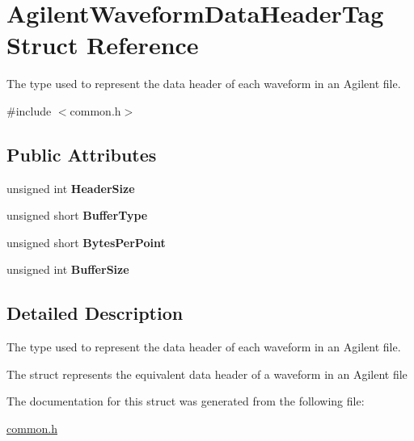 \hypertarget{structAgilentWaveformDataHeaderTag}{
\section{AgilentWaveformDataHeaderTag Struct Reference}
\label{structAgilentWaveformDataHeaderTag}
}


The type used to represent the data header of each waveform in an Agilent file.  




{\ttfamily \#include $<$common.h$>$}

\subsection*{Public Attributes}
\begin{DoxyCompactItemize}
\item 
\hypertarget{structAgilentWaveformDataHeaderTag_a4481ec545f9c73102462cf9e0370fc5c}{
unsigned int {\bfseries HeaderSize}}
\label{structAgilentWaveformDataHeaderTag_a4481ec545f9c73102462cf9e0370fc5c}

\item 
\hypertarget{structAgilentWaveformDataHeaderTag_a8a15a394ae79b88d0519b6ebff987bcc}{
unsigned short {\bfseries BufferType}}
\label{structAgilentWaveformDataHeaderTag_a8a15a394ae79b88d0519b6ebff987bcc}

\item 
\hypertarget{structAgilentWaveformDataHeaderTag_ae66073a59d0064c03ee35b16a212b4af}{
unsigned short {\bfseries BytesPerPoint}}
\label{structAgilentWaveformDataHeaderTag_ae66073a59d0064c03ee35b16a212b4af}

\item 
\hypertarget{structAgilentWaveformDataHeaderTag_ac3ccd48102c805f624124e14a86eb257}{
unsigned int {\bfseries BufferSize}}
\label{structAgilentWaveformDataHeaderTag_ac3ccd48102c805f624124e14a86eb257}

\end{DoxyCompactItemize}


\subsection{Detailed Description}
The type used to represent the data header of each waveform in an Agilent file. 

The struct represents the equivalent data header of a waveform in an Agilent file 

The documentation for this struct was generated from the following file:\begin{DoxyCompactItemize}
\item 
\hyperlink{common_8h}{common.h}\end{DoxyCompactItemize}
